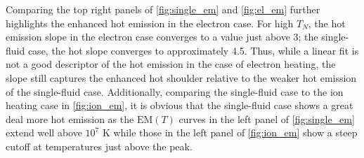 \documentclass[tighten,apj]{emulateapj}
\begin{document}
	\par Comparing the top right panels of \autoref{fig:single_em} and \autoref{fig:el_em} further highlights the enhanced hot emission in the electron case. For high $T_N$, the hot emission slope in the electron case converges to a value just above 3; the single-fluid case, the hot slope converges to approximately 4.5. Thus, while a linear fit is not a good descriptor of the hot emission in the case of electron heating, the slope still captures the enhanced hot shoulder relative to the weaker hot emission of the single-fluid case. Additionally, comparing the single-fluid case to the ion heating case in \autoref{fig:ion_em}, it is obvious that the single-fluid case shows a great deal more hot emission as the $\mathrm{EM}(T)$ curves in the left panel of \autoref{fig:single_em} extend well above $10^7$ K while those in the left panel of \autoref{fig:ion_em} show a steep cutoff at temperatures just above the peak.
\end{document}
